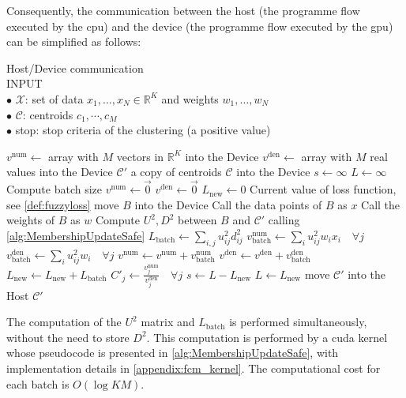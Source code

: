 \begin{toReview}
	\noindent Consequently, the communication between the host (the programme flow executed by the \gls{cpu}) and the device (the programme flow executed by the \gls{gpu}) can be simplified as follows:
	\newpage
	\begin{algorithm}[H]
		\caption{Host/Device communication\\
			\textsc{INPUT}\\
			$\bullet$ $\mathcal{X}$: set of data $x_1,\ldots,x_N\in\mathbb{R}^K$ and weights $w_1,\ldots,w_N$\\
			$\bullet$ $\mathcal{C}$: centroids $c_1,\cdots,c_M$\\
			$\bullet$ stop: stop criteria of the clustering (a positive value)
		}
		\begin{algorithmic}[1]
				\State $v^\text{num} \gets $ array with $M$ vectors in $\mathbb{R}^K$ into the Device
				\State $v^\text{den} \gets $ array with $M$ real values into the Device
				\State $\mathcal{C}'$ a copy of centroids $\mathcal{C}$ into the Device
				\State $s \gets \infty$
				\State $L \gets \infty$
					\State Compute batch size
					\State $v^\text{num}\gets \vec{0}$
					\State $v^\text{den}\gets \vec{0}$
					\State $L_\text{new} \gets 0$ \Comment Current value of loss function, see \cref{def:fuzzyloss}
						\State move $B$ into the Device
						\State Call the data points of $B$ as $x$
						\State Call the weights of $B$ as $w$
						\State Compute $U^2, D^2$ between $B$ and $\mathcal{C}'$ \Comment calling \cref{alg:MembershipUpdateSafe}
						\State $L_\text{batch} \gets \sum_{i,j}u_{ij}^2d_{ij}^2$
						\State $v^\text{num}_\text{batch} \gets \sum_{i} u_{ij}^2w_ix_i\quad\forall j$
						\State $v^\text{den}_\text{batch} \gets \sum_{i} u_{ij}^2w_i\quad\forall j$
						\State $v^\text{num} \gets v^\text{num} + v^\text{num}_\text{batch}$
						\State $v^\text{den} \gets v^\text{den} + v^\text{den}_\text{batch}$
						\State $L_\text{new} \gets L_\text{new} + L_\text{batch}$
					\EndFor
					\State $C'_j \gets \frac{v^\text{num}_j}{ v^\text{den}_j} \quad \forall j$
					\State $s \gets L - L_\text{new}$
					\State $L \gets L_\text{new}$
				\EndWhile
				\State move $\mathcal{C}'$ into the Host
				\State \Return $\mathcal{C}'$
			\EndFunction
			\label{alg:FCMwrapper}
		\end{algorithmic}
	\end{algorithm}

	\noindent The computation of the $U^2$ matrix and $L_\text{batch}$ is performed simultaneously, without the need to store $D^2$. This computation is performed by a \gls{cuda} kernel whose pseudocode is presented in \cref{alg:MembershipUpdateSafe}, with implementation details in \cref{appendix:fcm_kernel}. The computational cost for each batch is $O(\log KM)$.


\end{toReview}
